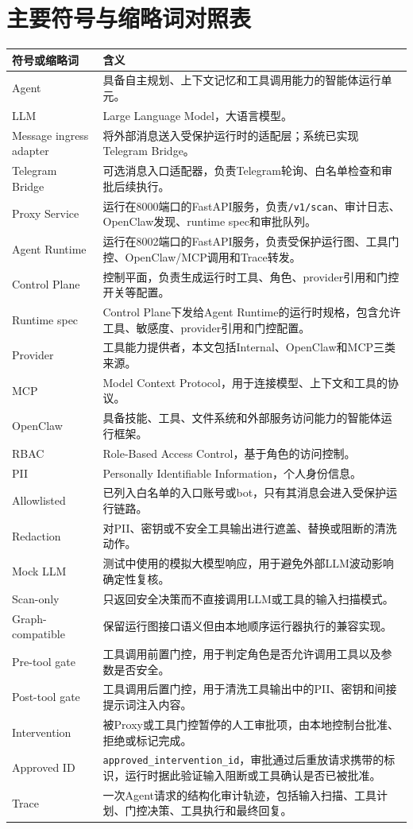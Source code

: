 \documentclass[UTF8,zihao=-4,scheme=chinese,fontset=none]{ctexart}
\newcommand{\code}[1]{{\ttfamily\small\nolinkurl{#1}}}
\begin{document}
\section*{主要符号与缩略词对照表}
\begin{longtable}{p{3.0cm}p{10.2cm}}
\toprule
符号或缩略词 & 含义 \\
\midrule
Agent & 具备自主规划、上下文记忆和工具调用能力的智能体运行单元。 \\
LLM & Large Language Model，大语言模型。 \\
Message ingress adapter & 将外部消息送入受保护运行时的适配层；系统已实现Telegram Bridge。 \\
Telegram Bridge & 可选消息入口适配器，负责Telegram轮询、白名单检查和审批后续执行。 \\
Proxy Service & 运行在8000端口的FastAPI服务，负责\code{/v1/scan}、审计日志、OpenClaw发现、runtime spec和审批队列。 \\
Agent Runtime & 运行在8002端口的FastAPI服务，负责受保护运行图、工具门控、OpenClaw/MCP调用和Trace转发。 \\
Control Plane & 控制平面，负责生成运行时工具、角色、provider引用和门控开关等配置。 \\
Runtime spec & Control Plane下发给Agent Runtime的运行时规格，包含允许工具、敏感度、provider引用和门控配置。 \\
Provider & 工具能力提供者，本文包括Internal、OpenClaw和MCP三类来源。 \\
MCP & Model Context Protocol，用于连接模型、上下文和工具的协议。 \\
OpenClaw & 具备技能、工具、文件系统和外部服务访问能力的智能体运行框架。 \\
RBAC & Role-Based Access Control，基于角色的访问控制。 \\
PII & Personally Identifiable Information，个人身份信息。 \\
Allowlisted & 已列入白名单的入口账号或bot，只有其消息会进入受保护运行链路。 \\
Redaction & 对PII、密钥或不安全工具输出进行遮盖、替换或阻断的清洗动作。 \\
Mock LLM & 测试中使用的模拟大模型响应，用于避免外部LLM波动影响确定性复核。 \\
Scan-only & 只返回安全决策而不直接调用LLM或工具的输入扫描模式。 \\
Graph-compatible & 保留运行图接口语义但由本地顺序运行器执行的兼容实现。 \\
Pre-tool gate & 工具调用前置门控，用于判定角色是否允许调用工具以及参数是否安全。 \\
Post-tool gate & 工具调用后置门控，用于清洗工具输出中的PII、密钥和间接提示词注入内容。 \\
Intervention & 被Proxy或工具门控暂停的人工审批项，由本地控制台批准、拒绝或标记完成。 \\
Approved ID & \code{approved\_intervention\_id}，审批通过后重放请求携带的标识，运行时据此验证输入阻断或工具确认是否已被批准。 \\
Trace & 一次Agent请求的结构化审计轨迹，包括输入扫描、工具计划、门控决策、工具执行和最终回复。 \\
\bottomrule
\end{longtable}
\end{document}
